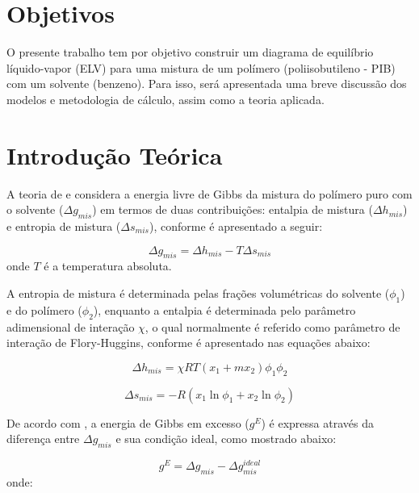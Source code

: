\section{Objetivos}
O presente trabalho tem por objetivo construir um diagrama de equilíbrio
líquido-vapor (ELV) para uma mistura de um polímero (poliisobutileno - PIB) com
um solvente (benzeno). Para isso, será apresentada uma breve discussão dos
modelos e metodologia de cálculo, assim como a teoria aplicada.

\section{Introdução Teórica}


A teoria de  e  considera a
energia livre de Gibbs da mistura do polímero puro com o solvente
($\Delta g_{mis}$) em termos de duas contribuições: entalpia de mistura 
($\Delta h_{mis}$) e entropia de mistura ($\Delta s_{mis}$), conforme é
apresentado a seguir:

\begin{equation}\label{eq:gemist}
\Delta g_{mis} = \Delta h_{mis} - T\Delta s_{mis}
\end{equation}
onde $T$ é a temperatura absoluta.

A entropia de mistura é determinada pelas frações volumétricas do solvente
($\phi_1$) e do polímero ($\phi_2$), enquanto a entalpia é determinada pelo
parâmetro adimensional de interação $\chi$, o qual normalmente é referido como parâmetro de interação de
Flory-Huggins, conforme é apresentado nas equações abaixo: 

\begin{equation}\label{eq:entalexc}
\Delta h_{mis} = \chi RT\left( x_1 + mx_2 \right)\phi_1\phi_2
\end{equation}

\begin{equation}\label{eq:entroexc}
\Delta s_{mis} = -R\left( x_1\ln\phi_1 + x_2\ln\phi_2 \right)
\end{equation}

De acordo com , a energia de Gibbs em
excesso ($g^E$) é expressa através da diferença entre $\Delta g_{mis}$ e sua
condição ideal, como mostrado abaixo:

\begin{equation}\label{eq:geexc1}
g^E = \Delta g_{mis} - \Delta g_{mis}^{ideal}
\end{equation}
onde:

